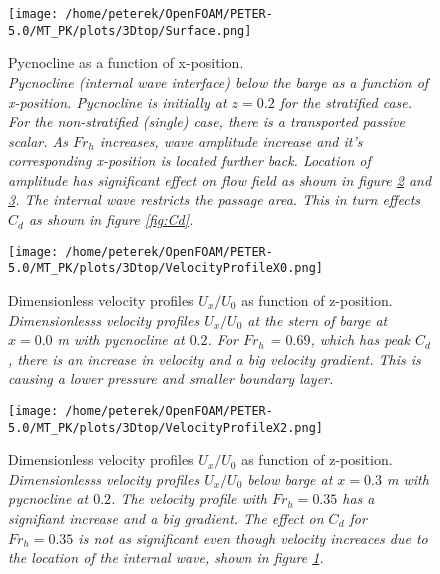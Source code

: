 \documentclass[a4paper, 12pt]{report}
\begin{document}
\begin{figure}[H]
	\centering
	\texttt{[image: /home/peterek/OpenFOAM/PETER-5.0/MT\_PK/plots/3Dtop/Surface.png]}
	\caption{Pycnocline as a function of x-position. \\ \textit{Pycnocline (internal wave interface) below the barge as a function of x-position. Pycnocline is initially at $z = 0.2$ for the stratified case. For the non-stratified (single) case, there is a transported passive scalar. As $Fr_h$ increases, wave amplitude increase and it's corresponding x-position is located further back. Location of amplitude has significant effect on flow field as shown in figure \ref{fig:velocityProfileX0} and \ref{fig:velocityProfileX03}. The internal wave restricts the passage area. This in turn effects $C_d$ as shown in figure \ref{fig:Cd}. }}
	\label{fig:eta}
\end{figure}

\begin{figure}[H]
	\centering
	\texttt{[image: /home/peterek/OpenFOAM/PETER-5.0/MT\_PK/plots/3Dtop/VelocityProfileX0.png]}
	\caption{Dimensionless velocity profiles $U_x/U_0$ as function of z-position. \\ \textit{Dimensionlesss velocity profiles $U_x/U_0$ at the stern of barge at $x = 0.0$ m with pycnocline at $ 0.2$. For $Fr_h$ = $0.69$, which has peak $C_d$, there is an increase in velocity and a big velocity gradient. This is causing a lower pressure and smaller boundary layer.}}
	\label{fig:velocityProfileX0}
\end{figure}

\begin{figure}[H]
	\centering
	\texttt{[image: /home/peterek/OpenFOAM/PETER-5.0/MT\_PK/plots/3Dtop/VelocityProfileX2.png]}
	\caption{Dimensionless velocity profiles $U_x/U_0$ as function of z-position. \\ \textit{Dimensionlesss velocity profiles $U_x/U_0$ below barge at $x = 0.3$ m with pycnocline at $ 0.2$. The velocity profile with $Fr_h = 0.35$ has a signifiant increase and a big gradient. The effect on $C_d$ for $Fr_h = 0.35$ is not as significant even though velocity increaces due to the location of the internal wave, shown in figure \ref{fig:eta}.  }}
	\label{fig:velocityProfileX03}
\end{figure}
\end{document}
